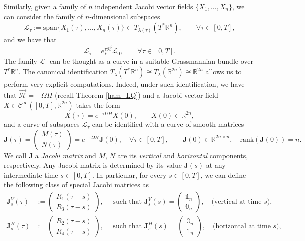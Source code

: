 \documentclass[reqno]{amsart}
\theoremstyle{plain}
\theoremstyle{definition}
\theoremstyle{remark}
\begin{document}
        Similarly, given a family of $n$ independent Jacobi vector fields $\{X_1,\dots, X_n\}$, we can consider the family of $n$-dimensional subspaces
		\begin{equation}
			\mathcal{L}_\tau:=\mathrm{span}\{X_1(\tau),\dots,X_n(\tau)\}\subset T_{\lambda(\tau)}(T^*\mathbb{R}^n),\qquad \forall \tau\in[0,T], 
		\end{equation}
		and we have that 
		\begin{equation}
			\mathcal{L}_\tau=e^{\tau\overrightarrow{\mathcal{H}}}_{*}\mathcal{L}_0,\qquad\forall \tau\in[0,T].
		\end{equation}
		The family $\mathcal{L}_\tau$ can be thought as a curve in a suitable Grassmannian bundle over $T^*\mathbb{R}^n$.
        The canonical identification $T_{\lambda}(T^*\mathbb{R}^n)\cong T_{\lambda}(\mathbb{R}^{2n})\cong\mathbb{R}^{2n}$ allows us to perform very explicit computations. Indeed, under such identification, we have that $\overrightarrow{\mathcal{H}}=-\Omega H$ (recall Theorem \ref{ham_LQ}) and a Jacobi vector field $X\in\mathcal{C}^{\infty}([0,T],\mathbb{R}^{2n})$ takes the form
		\begin{equation}	
			X(\tau)=e^{-\tau\Omega H}X(0),\qquad X(0)\in\mathbb{R}^{2n},
		\end{equation}
		and a curve of subspaces $\mathcal{L}_\tau$ can be identified with a curve of smooth matrices
		\begin{equation}
			\mathbf{J}(\tau)=\begin{pmatrix}
				M(\tau)\\
				N(\tau)
			\end{pmatrix}=e^{-\tau\Omega H}\mathbf{J}(0),\quad \forall \tau\in[0,T],\qquad\mathbf{J}(0)\in\mathbb{R}^{2n\times n},\quad \mathrm{rank}(\mathbf{J}(0))=n.
		\end{equation}
		We call $\mathbf{J}$ a \emph{Jacobi matrix} and $M$, $N$ are its \emph{vertical} and \emph{horizontal} components, respectively. Any Jacobi matrix is determined by its value $\mathbf{J}(s)$ at any intermediate time $s\in[0,T]$. In particular, for every $s\in[0,T]$, we can define the following class of special Jacobi matrices as 
		\begin{align}
			\mathbf{J}^V_s(\tau)&:=\begin{pmatrix}
				R_1(\tau-s)\\
				R_3(\tau-s)
			\end{pmatrix},\quad \text{ such that }\mathbf{J}^V_s(s)=\begin{pmatrix}
			\mathbb{1}_n\\
			\mathbb{0}_n
			\end{pmatrix},\quad \text{(vertical at time }s),\\
			\mathbf{J}^H_s(\tau)&:=\begin{pmatrix}
				R_2(\tau-s)\\
				R_4(\tau-s)
			\end{pmatrix},\quad \text{ such that }\mathbf{J}^H_s(s)=\begin{pmatrix}
				\mathbb{0}_n\\
				\mathbb{1}_n
			\end{pmatrix},\quad \text{(horizontal at time }s),
		\end{align}
\end{document}
